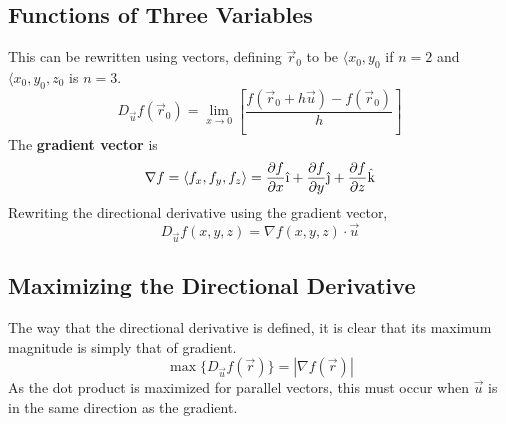 \documentclass[../Calculus_\Roman{3}]{subfiles}
\begin{document}
		\subsection*{Functions of Three Variables}
			This can be rewritten using vectors, defining $\vec{r}_0$ to be $\langle x_0, y_0$ if $n = 2$ and $\langle x_0, y_0, z_0$ is $n = 3$.
				\[D_{\vec{u}}f(\vec{r}_0) = \lim_{x \to 0}\left[\frac{f(\vec{r}_0 + h\vec{u}) - f(\vec{r}_0)}{h}\right]\]
			The \textbf{gradient vector} is
				\[\nabla f = \langle f_x, f_y, f_z \rangle = \pder{f}{x}\vi + \pder{f}{y}\vj + \pder{f}{z}\vk\]
				Rewriting the directional derivative using the gradient vector,
					\[D_{\vec{u}}f(x, y, z) = \nabla f(x, y, z) \cdot \vec{u}\]
		\subsection*{Maximizing the Directional Derivative}
				The way that the directional derivative is defined, it is clear that its maximum magnitude is simply that of gradient.
					\[\max\{D_{\vec{u}}f(\vec{r})\} = |\nabla f(\vec{r})|\]
				As the dot product is maximized for parallel vectors, this must occur when $\vec{u}$ is in the same direction as the gradient.
\end{document}
